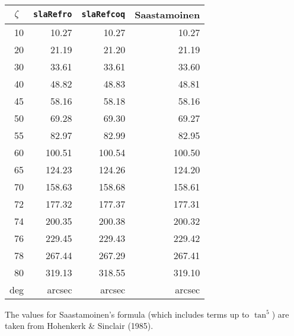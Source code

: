 \documentclass[11pt,fleqn,twoside]{article}
\renewcommand{\_}{{\tt\char'137}}     %
\begin{document}
{\begin{enumerate}
        ~~~~~~~~~~
        \begin{tabular}{|r|r|r|r|} \hline
        \multicolumn{1}{|c}{$\zeta$} &
        \multicolumn{1}{|c}{{\tt slaRefro}} &
        \multicolumn{1}{|c}{{\tt slaRefcoq}} &
        \multicolumn{1}{|c|}{Saastamoinen} \\ \hline
        10 &  10.27 &  10.27 &  10.27 \\
        20 &  21.19 &  21.20 &  21.19 \\
        30 &  33.61 &  33.61 &  33.60 \\
        40 &  48.82 &  48.83 &  48.81 \\
        45 &  58.16 &  58.18 &  58.16 \\
        50 &  69.28 &  69.30 &  69.27 \\
        55 &  82.97 &  82.99 &  82.95 \\
        60 & 100.51 & 100.54 & 100.50 \\
        65 & 124.23 & 124.26 & 124.20 \\
        70 & 158.63 & 158.68 & 158.61 \\
        72 & 177.32 & 177.37 & 177.31 \\
        74 & 200.35 & 200.38 & 200.32 \\
        76 & 229.45 & 229.43 & 229.42 \\
        78 & 267.44 & 267.29 & 267.41 \\
        80 & 319.13 & 318.55 & 319.10 \\ \hline
        deg & arcsec & arcsec & arcsec \\ \hline
        \end{tabular}
 
        \vspace{3ex}
 
        The values for Saastamoinen's formula (which includes terms
        up to $\tan^5$) are taken from Hohenkerk \& Sinclair (1985).
 

\end{enumerate}}
\end{document}
